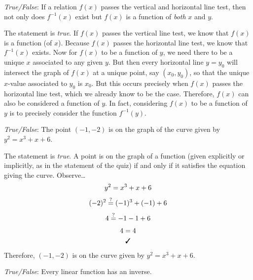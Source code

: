 \documentclass[11pt,letterpaper]{article}
\begin{document}
\quizsol \textit{True/False}: If a relation $f(x)$ passes the vertical and horizontal line test, then not only does $f^{-1}(x)$ exist but $f(x)$ is a function of \textit{both} $x$ and $y$. \pspace

\sol The statement is \textit{true}. If $f(x)$ passes the vertical line test, we know that $f(x)$ is a function (of $x$). Because $f(x)$ passes the horizontal line test, we know that $f^{-1}(x)$ exists. Now for $f(x)$ to be a function of $y$, we need there to be a unique $x$ associated to any given $y$. But then every horizontal line $y= y_0$ will intersect the graph of $f(x)$ at a unique point, say $(x_0, y_0)$, so that the unique $x$-value associated to $y_0$ is $x_0$. But this occurs precisely when $f(x)$ passes the horizontal line test, which we already know to be the case. Therefore, $f(x)$ can also be considered a function of $y$. In fact, considering $f(x)$ to be a function of $y$ is to precisely consider the function $f^{-1}(y)$. \pvspace{0.8cm}



\quizsol \textit{True/False}: The point $(-1, -2)$ is on the graph of the curve given by $y^2= x^3 + x + 6$. \pspace

\sol The statement is \textit{true}. A point is on the graph of a function (given explicitly or implicitly, as in the statement of the quiz) if and only if it satisfies the equation giving the curve. Observe\dots
	\[
	\begin{gathered}
	y^2 = x^3 + x + 6 \\[0.1cm]
	(-2)^2 \stackrel{?}{=} (-1)^3 + (-1) + 6 \\[0.1cm]
	4 \stackrel{?}{=} -1 - 1 + 6 \\[0.1cm]
	4 = 4 \\
	\text{\cmark}
	\end{gathered}
	\]
Therefore, $(-1, -2)$ is on the curve given by $y^2= x^3 + x + 6$. 







\quizsol \textit{True/False}: Every linear function has an inverse. 
\end{document}
